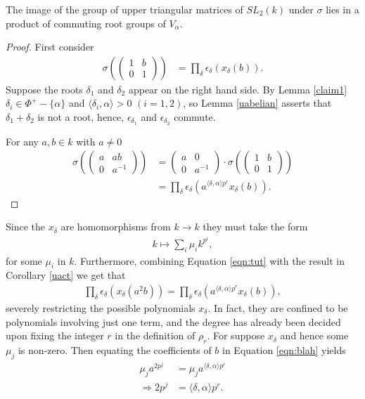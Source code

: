 \begin{corollary} The image of the group of upper triangular matrices of $SL_2(k)$ under $\sigma$ lies in a product of commuting root groups of $V_\alpha$.
  \label{cor:im_ab}
\end{corollary}
\begin{proof}
First consider
\begin{align*}
\sigma\left(\left( \begin{matrix} 1 & b \\ 0 & 1 \end{matrix}\right)\right) &= \prod_\delta \epsilon_\delta\left(x_\delta(b)\right).
\end{align*}
Suppose the roots $\delta_1$ and $\delta_2$ appear on the right hand side. By Lemma \ref{claim1} $\delta_i \in \Phi^+ - \{\alpha\}$ and $\langle \delta_i, \alpha \rangle > 0$ $(i=1,2)$, so Lemma \ref{uabelian} asserts that $\delta_1 + \delta_2$ is not a root, hence, $\epsilon_{\delta_1}$ and $\epsilon_{\delta_2}$ commute. 

For any $a, b\in k$ with $a\neq 0$
\begin{align*}
\sigma\left(\left(\begin{matrix} a & ab \\ 0 & a^{-1}\end{matrix}\right)\right) 
&= \left(\begin{matrix} a & 0 \\ 0 & a^{-1}\end{matrix} \right) \cdot
\sigma\left(\left(\begin{matrix} 1 & b \\ 0 & 1\end{matrix}\right)\right) \\
&= \prod_\delta \epsilon_\delta\left(a^{\langle \delta, \alpha \rangle p^r}x_\delta\left(b\right)\right).
\end{align*}
\end
{proof}

Since the $x_\delta$ are homomorphisms from $k\rightarrow k$ they must take the form
\begin{align*}
k\mapsto\sum_i \mu_i k^{p^i},
\end{align*}
for some $\mu_i$ in $k$. Furthermore, combining Equation \ref{eqn:tut} with the result in Corollary \ref{uact} we get that
\begin{align}
\prod_\delta \epsilon_\delta\left(x_\delta\left(a^2b\right)\right) = \prod_\delta \epsilon_\delta\left(a^{\langle \delta, \alpha \rangle p^r}x_\delta\left(b\right)\right),
\label{eqn:blah}
\end{align}
severely restricting the possible polynomials $x_\delta$. In fact, they are confined to be polynomials involving just one term, and the degree has already been decided upon fixing the integer $r$ in the definition of $\rho_r$. For suppose $x_\delta$ and hence some $\mu_j$ is non-zero. Then equating the coefficients of $b$ in Equation \ref{eqn:blah} yields
\begin{align*}
\mu_ja^{2p^j} &= \mu_j a^{\langle \delta, \alpha \rangle p^r}\\
\Longrightarrow2p^j &= \langle \delta, \alpha \rangle p^r.
\end{align*}


